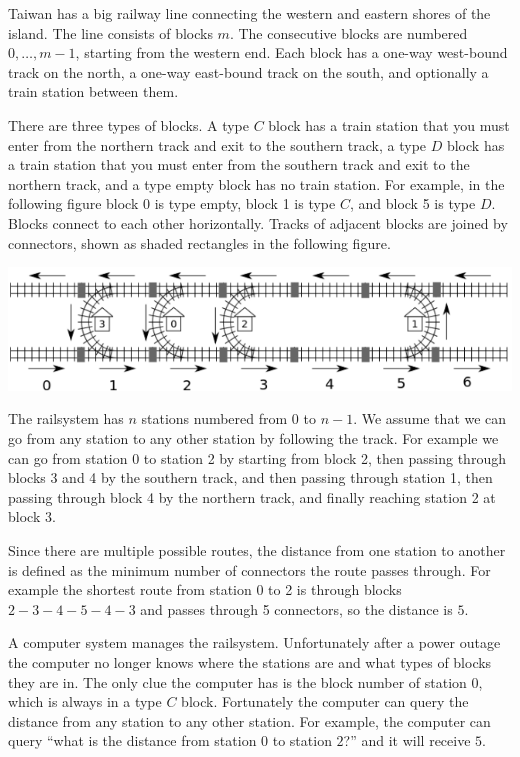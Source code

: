 Taiwan has a big railway line connecting the western and eastern shores of the island. The line consists of blocks $m$. The consecutive blocks are numbered $0, \ldots, m - 1$, starting from the western end. Each block has a one-way west-bound track on the north, a one-way east-bound track on the south, and optionally a train station between them.

There are three types of blocks. A type $C$ block has a train station that you must enter from the northern track and exit to the southern track, a type $D$ block has a train station that you must enter from the southern track and exit to the northern track, and a type empty block has no train station. For example, in the following figure block 0 is type empty, block 1 is type $C$, and block 5 is type $D$. Blocks connect to each other horizontally. Tracks of adjacent blocks are joined by connectors, shown as shaded rectangles in the following figure.

\includegraphics[scale=0.7]{1.png}

The railsystem has $n$ stations numbered from $0$ to $n - 1$. We assume that we can go from any station to any other station by following the track. For example we can go from station 0 to station 2 by starting from block 2, then passing through blocks 3 and 4 by the southern track, and then passing through station 1, then passing through block 4 by the northern track, and finally reaching station 2 at block 3.

Since there are multiple possible routes, the distance from one station to another is defined as the minimum number of connectors the route passes through. For example the shortest route from station 0 to 2 is through blocks $2-3-4-5-4-3$ and passes through 5 connectors, so the distance is $5$.

A computer system manages the railsystem. Unfortunately after a power outage the computer no longer knows where the stations are and what types of blocks they are in. The only clue the computer has is the block number of station 0, which is always in a type $C$ block. Fortunately the computer can query the distance from any station to any other station. For example, the computer can query ``what is the distance from station $0$ to station $2$?'' and it will receive $5$.

